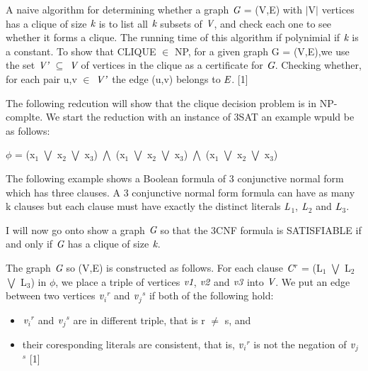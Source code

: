 \documentclass[a4paper]{report}
\begin{document}
\vspace{3mm}
A naive algorithm for determining whether a graph $\emph{G}$ = (V,E) with $\vert$V$\vert$ vertices has a clique of size $\emph{k}$ is to list all $\emph{k}$ subsets of $\emph{V}$, and check each one to see whether it forms a clique. The running time of this algorithm if polynimial if $\emph{k}$ is a constant. To show that CLIQUE $\in$ NP, for a given graph G = (V,E),we use the set $\emph{V'}$ $\subseteq$ $\emph{V}$ of vertices in the clique as a certificate for $\emph{G}$. Checking whether, for each pair u,v $\in$ $\emph{V'}$\, the edge (u,v) belongs to $\emph{E}$. [1]

The following redcution will show that the clique decision problem is in NP-complte. We start the reduction with an instance of 3SAT an example wpuld be as follows:

\vspace{3mm}
$\phi$ = (x$_{1}$ $\bigvee$ x$_{2}$ $\bigvee$ x$_{3}$) $\bigwedge$ (x$_{1}$ $\bigvee$ x$_{2}$ $\bigvee$ x$_{3}$) $\bigwedge$ (x$_{1}$ $\bigvee$ x$_{2}$ $\bigvee$ x$_{3}$)

\vspace{3mm}
The following example shows a Boolean formula of 3 conjunctive normal form which has three clauses. A 3 conjunctive normal form formula can have as many k clauses but each clause must have exactly the distinct literals $\emph{L}$$_{1}$, $\emph{L}$$_{2}$ and $\emph{L}$$_{3}$.

\vspace{3mm}
I will now go onto show a graph $\emph{G}$ so that the 3CNF formula is SATISFIABLE if and only if $\emph{G}$ has a clique of size $\emph{k}$.

\vspace{3mm}
The graph $\emph{G}$ so (V,E) is constructed as follows. For each clause $\emph{C}$$^{r}$ = (L$_{1}$ $\bigvee$ L$_{2}$ $\bigvee$ L$_{3}$) in $\phi$, we place a triple of vertices $\emph{v1}$, $\emph{v2}$ and $\emph{v3}$ into $\emph{V}$. We put an edge between two vertices $\emph{v}$$_{i}$$^{r}$ and $\emph{v}$$_{j}$$^{s}$ if both of the following hold:

\begin{itemize}
\item
$\emph{v}$$_{i}$$^{r}$ and $\emph{v}$$_{j}$$^{s}$ are in different triple, that is r $\ne$ s, and 

\item
their coresponding literals are consistent, that is, $\emph{v}$$_{i}$$^{r}$ is not the negation of $\emph{v}$$_{j}$$^{s}$ [1]

\end{itemize} 
\end{document}
